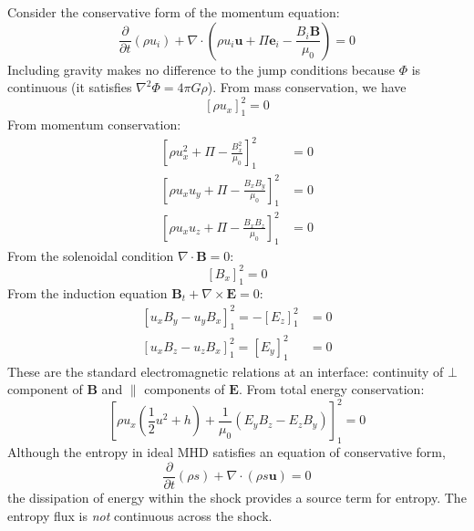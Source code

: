 \documentclass{jknotes}
\newcommand{\B}{\symbf{B}}
\renewcommand{\u}{\symbf{u}}
\newcommand{\dif}[1]{\left[#1\right]_1^2}
\begin{document}
Consider the conservative form of the momentum equation:
\begin{equation}
	\frac{\partial}{\partial t}(\rho u_i) + \nabla \cdot \left(\rho u_i \u + \Pi
	\symbf{e}_i - \frac{B_i \B}{\mu_0}\right) = 0
\end{equation}
Including gravity makes no difference to the jump conditions because $\Phi$ is
continuous (it satisfies $\nabla^2 \Phi = 4\pi G \rho$). From mass
conservation, we have
\begin{equation}
	\dif{\rho u_x} = 0
\end{equation}
From momentum conservation:
\begin{align}
	\dif{\rho u_x^2 + \Pi - \frac{B_x^2}{\mu_0}} &= 0 \\
	\dif{\rho u_x u_y + \Pi - \frac{B_x B_y}{\mu_0}} &= 0 \\
	\dif{\rho u_x u_z + \Pi - \frac{B_x B_z}{\mu_0}} &= 0
\end{align}
From the solenoidal condition $\nabla \cdot \B = 0$:
\begin{equation}
	\dif{B_x} =0 
\end{equation}
From the induction equation $\B_t + \nabla \times \symbf{E} = 0$:
\begin{align}
	\dif{u_x B_y - u_y B_x} = -\dif{E_z} &= 0 \\
	\dif{u_x B_z - u_z B_x} = \dif{E_y} &= 0
\end{align}
These are the standard electromagnetic relations at an interface: continuity
of $\bot$ component of $\B$ and $\parallel$ components of $\symbf{E}$. From
total energy conservation:
\begin{equation}
	\dif{\rho u_x\left(\frac{1}{2}u^2 + h\right) + \frac{1}{\mu_0}(E_yB_z -
	E_z B_y)} = 0
\end{equation}
Although the entropy in ideal MHD satisfies an equation of conservative form,
\begin{equation}
	\frac{\partial}{\partial t}(\rho s) + \nabla \cdot (\rho s \u) = 0
\end{equation}
the dissipation of energy within the shock provides a source term for entropy.
The entropy flux is \emph{not} continuous across the shock.
\end{document}
